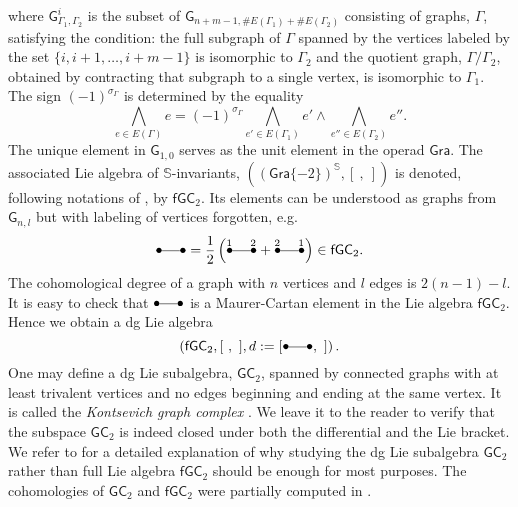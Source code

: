 \documentclass{amsart}
\theoremstyle{plain}
\theoremstyle{definition}
\begin{document}
where $ {{\mathsf G}}_{{\Gamma}_1, {\Gamma}_2}^i$ is the subset of ${{\mathsf G}}_{n+m-1, \# E({\Gamma}_1) + \#E({\Gamma}_2)}$ consisting
of graphs, ${\Gamma}$, satisfying the condition: the full subgraph of ${\Gamma}$ spanned by the vertices labeled by
the set $\{i,i+1, \ldots, i+m-1\}$ is isomorphic to ${\Gamma}_2$ and the quotient graph, ${\Gamma}/{\Gamma}_2$, obtained by contracting that subgraph to a single vertex, is isomorphic to ${\Gamma}_1$. The sign $(-1)^{\sigma_\Gamma}$ is determined by the equality
$$
\bigwedge_{e\in E({\Gamma})}e= (-1)^{\sigma_\Gamma}\bigwedge_{e'\in E({\Gamma}_1)}e' \wedge \bigwedge_{e''\in E({\Gamma}_2)}e''.
$$
The unique element in ${{\mathsf G}}_{1,0}$ serves as the unit element in the operad  ${{\mathsf G}} {{\mathsf r}}{{\mathsf a}}$. The associated  Lie algebra of  ${{\mathbb S}}$-invariants, $(({{\mathsf G}} {{\mathsf r}}{{\mathsf a}}\{-2\})^{{\mathbb S}},[\ ,\ ])$ is denoted, following notations
of \cite{Wi}, by ${{\mathsf f}}{{\mathsf G}}{{\mathsf C}}_2$. Its elements can be understood as
graphs from ${{\mathsf G}}_{n,l}$ but with labeling of vertices forgotten, e.g.
$$
\xy
 (0,0)*{\bullet}="a",
(6,0)*{\bullet}="b",
\ar @{-} "a";"b" <0pt>
\endxy = \frac{1}{2}\left(\xy
(0,2)*{_{1}},
(6,2)*{_{2}},
 (0,0)*{\bullet}="a",
(6,0)*{\bullet}="b",
\ar @{-} "a";"b" <0pt>
\endxy + \xy
(0,2)*{_{2}},
(6,2)*{_{1}},
 (0,0)*{\bullet}="a",
(6,0)*{\bullet}="b",
\ar @{-} "a";"b" <0pt>
\endxy\right)\in {{\mathsf f}}{{\mathsf G}}{{\mathsf C}}_2.
$$
The cohomological degree of a graph with $n$ vertices and $l$ edges is $2(n-1)-l$.
It is easy to check that $\xy
 (0,0)*{\bullet}="a",
(6,0)*{\bullet}="b",
\ar @{-} "a";"b" <0pt>
\endxy$ is a Maurer-Cartan element in the Lie algebra ${{\mathsf f}}{{\mathsf G}}{{\mathsf C}}_2$. Hence we obtain a dg Lie algebra
$$
\left({{\mathsf f}}{{\mathsf G}}{{\mathsf C}}_2, [\ ,\ ], d:=[\xy
 (0,0)*{\bullet}="a",
(6,0)*{\bullet}="b",
\ar @{-} "a";"b" <0pt>
\endxy,\ ] \right).
$$
One may define a dg Lie subalgebra, ${{\mathsf G}}{{\mathsf C}}_2$, spanned by connected graphs with at least trivalent vertices and no edges beginning and ending at the same vertex. It is called
the {\em Kontsevich graph complex} \cite{Ko}.
We leave it to the reader to verify that the subspace ${{\mathsf G}}{{\mathsf C}}_2$ is indeed closed under both the differential and the Lie bracket.
We refer to \cite{Wi} for a detailed explanation of why studying
the dg Lie subalgebra  ${{\mathsf G}}{{\mathsf C}}_2$ rather than full Lie algebra ${{\mathsf f}}{{\mathsf G}}{{\mathsf C}}_2$ should be enough for most purposes. The cohomologies of ${{\mathsf G}}{{\mathsf C}}_2$ and ${{\mathsf f}}{{\mathsf G}}{{\mathsf C}}_2$ were partially computed in \cite{Wi}.
\end{document}
